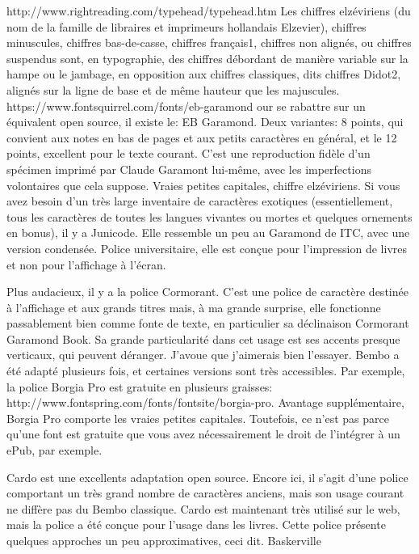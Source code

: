 \documentclass[12pt,a4paper,twocolumn]{book} %
\begin{document}
http://www.rightreading.com/typehead/typehead.htm
Les chiffres elzéviriens (du nom de la famille de libraires et imprimeurs hollandais Elzevier), chiffres minuscules, chiffres bas-de-casse, chiffres français1, chiffres non alignés, ou chiffres suspendus sont, en typographie, des chiffres débordant de manière variable sur la hampe ou le jambage, en opposition aux chiffres classiques, dits chiffres Didot2, alignés sur la ligne de base et de même hauteur que les majuscules. 
https://www.fontsquirrel.com/fonts/eb-garamond
our se rabattre sur un équivalent open source, il existe le: EB Garamond. Deux variantes: 8 points, qui convient aux notes en bas de pages et aux petits caractères en général, et le 12 points, excellent pour le texte courant. C’est une reproduction fidèle d’un spécimen imprimé par Claude Garamont lui-même, avec les imperfections volontaires que cela suppose. Vraies petites capitales, chiffre elzéviriens.
Si vous avez besoin d’un très large inventaire de caractères exotiques (essentiellement, tous les caractères de toutes les langues vivantes ou mortes et quelques ornements en bonus), il y a Junicode. Elle ressemble un peu au Garamond de ITC, avec une version condensée. Police universitaire, elle est conçue pour l’impression de livres et non pour l’affichage à l’écran.

Plus audacieux, il y a la police Cormorant. C’est une police de caractère destinée à l’affichage et aux grands titres mais, à ma grande surprise, elle fonctionne passablement bien comme fonte de texte, en particulier sa déclinaison Cormorant Garamond Book. Sa grande particularité dans cet usage est ses accents presque verticaux, qui peuvent déranger. J’avoue que j’aimerais bien l’essayer.
Bembo a été adapté plusieurs fois, et certaines versions sont très accessibles. Par exemple, la police Borgia Pro est gratuite en plusieurs graisses: http://www.fontspring.com/fonts/fontsite/borgia-pro. Avantage supplémentaire, Borgia Pro comporte les vraies petites capitales. Toutefois, ce n’est pas parce qu’une font est gratuite que vous avez nécessairement le droit de l’intégrer à un ePub, par exemple.

Cardo est une excellents adaptation open source. Encore ici, il s’agit d’une police comportant un très grand nombre de caractères anciens, mais son usage courant ne diffère pas du Bembo classique. Cardo est maintenant très utilisé sur le web, mais la police a été conçue pour l’usage dans les livres. Cette police présente quelques approches un peu approximatives, ceci dit.
Baskerville
\end{document}
